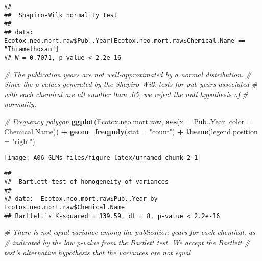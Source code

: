 \documentclass[]{article}
\newenvironment{Shaded}{\begin{snugshade}}{\end{snugshade}}
\newcommand{\KeywordTok}[1]{\textcolor[rgb]{0.13,0.29,0.53}{\textbf{#1}}}
\newcommand{\DataTypeTok}[1]{\textcolor[rgb]{0.13,0.29,0.53}{#1}}
\newcommand{\StringTok}[1]{\textcolor[rgb]{0.31,0.60,0.02}{#1}}
\newcommand{\CommentTok}[1]{\textcolor[rgb]{0.56,0.35,0.01}{\textit{#1}}}
\newcommand{\OperatorTok}[1]{\textcolor[rgb]{0.81,0.36,0.00}{\textbf{#1}}}
\newcommand{\NormalTok}[1]{#1}
\begin{document}
\begin{verbatim}
## 
##  Shapiro-Wilk normality test
## 
## data:  Ecotox.neo.mort.raw$Pub..Year[Ecotox.neo.mort.raw$Chemical.Name ==     "Thiamethoxam"]
## W = 0.7071, p-value < 2.2e-16
\end{verbatim}

\begin{Shaded}
\begin{Highlighting}[]
\CommentTok{# The publication years are not well-approximated by a normal distribution. }
\CommentTok{# Since the p-values generated by the Shapiro-Wilk tests for pub years associated}
\CommentTok{# with each chemical are all smaller than .05, we reject the null hypothesis of}
\CommentTok{# normality.}

\CommentTok{# Frequency polygon}
\KeywordTok{ggplot}\NormalTok{(Ecotox.neo.mort.raw, }\KeywordTok{aes}\NormalTok{(}\DataTypeTok{x =}\NormalTok{ Pub..Year, }\DataTypeTok{color =}\NormalTok{ Chemical.Name)) }\OperatorTok{+}
\StringTok{  }\KeywordTok{geom_freqpoly}\NormalTok{(}\DataTypeTok{stat =} \StringTok{"count"}\NormalTok{) }\OperatorTok{+}
\StringTok{  }\KeywordTok{theme}\NormalTok{(}\DataTypeTok{legend.position =} \StringTok{"right"}\NormalTok{)}
\end{Highlighting}
\end{Shaded}

\begin{center}\texttt{[image: A06\_GLMs\_files/figure-latex/unnamed-chunk-2-1]} \end{center}

\begin{Shaded}
\end{Shaded}

\begin{verbatim}
## 
##  Bartlett test of homogeneity of variances
## 
## data:  Ecotox.neo.mort.raw$Pub..Year by Ecotox.neo.mort.raw$Chemical.Name
## Bartlett's K-squared = 139.59, df = 8, p-value < 2.2e-16
\end{verbatim}

\begin{Shaded}
\begin{Highlighting}[]
\CommentTok{# There is not equal variance among the publication years for each chemical, as}
\CommentTok{# indicated by the low p-value from the Bartlett test. We accept the Bartlett }
\CommentTok{# test's alternative hypothesis that the variances are not equal}
\end{Highlighting}
\end{Shaded}
\end{document}

